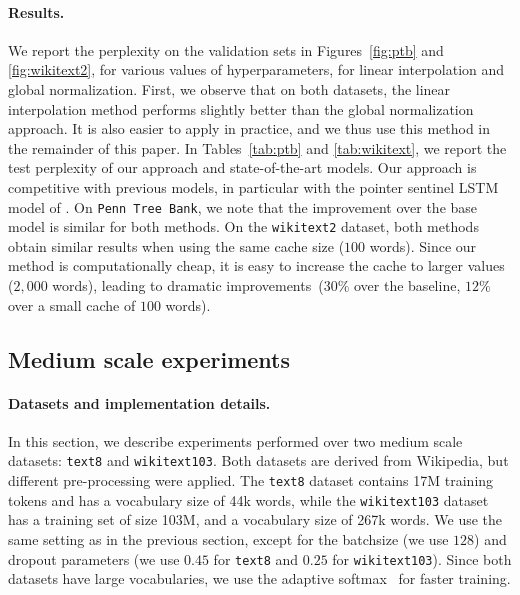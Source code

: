 \documentclass{article} \usepackage{iclr2017_conference,times}
\begin{document}
\paragraph{Results.} We report the perplexity on the validation sets in Figures~\ref{fig:ptb} and \ref{fig:wikitext2}, for various values of hyperparameters, for linear interpolation and global normalization.
First, we observe that on both datasets, the linear interpolation method performs slightly better than the global normalization approach.
It is also easier to apply in practice, and we thus use this method in the remainder of this paper.
In Tables~\ref{tab:ptb} and \ref{tab:wikitext}, we report the test perplexity of our approach and state-of-the-art models.
Our approach is competitive with previous models, in particular with the pointer sentinel LSTM model of \citet{merity2016pointer}.
On \texttt{Penn Tree Bank}, we note that the improvement over the base model is similar for both methods.
On the \texttt{wikitext2} dataset, both methods obtain similar results when using the same cache size ($100$ words).
Since our method is computationally cheap, it is easy to increase the cache to larger values ($2,000$ words), leading to dramatic improvements~($30\%$ over the baseline, $12\%$ over a small cache of $100$ words).

\subsection{Medium scale experiments}
\paragraph{Datasets and implementation details.} In this section, we describe experiments performed over two medium scale datasets: \texttt{text8} and \texttt{wikitext103}.
Both datasets are derived from Wikipedia, but different pre-processing were applied.
The \texttt{text8} dataset contains 17M training tokens and has a vocabulary size of 44k words, while the \texttt{wikitext103} dataset has a training set of size 103M, and a vocabulary size of 267k words.
We use the same setting as in the previous section, except for the batchsize (we use $128$) and dropout parameters (we use $0.45$ for \texttt{text8} and $0.25$ for \texttt{wikitext103}).
Since both datasets have large vocabularies, we use the adaptive softmax~\citep{grave2016efficient} for faster training.
\end{document}
